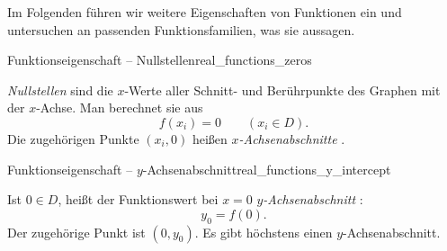 \par\noindent\begin{minipage}{\linewidth}
Im Folgenden führen wir weitere Eigenschaften von Funktionen ein und
untersuchen an passenden Funktionsfamilien, was sie aussagen.
\begin{DefinitionBox}{Funktionseigenschaft -- Nullstellen}{real_functions_zeros}
  \begin{minipage}[c]{0.55\linewidth}
    \raggedright
    \emph{Nullstellen}  sind die $x$-Werte aller Schnitt-
    und Berührpunkte des Graphen mit der $x$-Achse. Man berechnet sie aus
    \[
      f(x_i)=0\qquad(x_i\in D).
    \]
    Die zugehörigen Punkte $(x_i,0)$ heißen \emph{$x$-Achsenabschnitte}
    .
  \end{minipage}\hfill
  \begin{minipage}[c]{0.43\linewidth}
    \centering
  \end{minipage}
\end{DefinitionBox}
\end{minipage}
\begin{DefinitionBox}{Funktionseigenschaft -- $y$-Achsenabschnitt}{real_functions_y_intercept}
  \begin{minipage}[c]{0.55\linewidth}
    \raggedright
    Ist $0\in D$, heißt der Funktionswert bei $x=0$
    \emph{$y$-Achsenabschnitt} :
    \[
      y_0=f(0).
    \]
    Der zugehörige Punkt ist $(0,y_0)$. Es gibt höchstens einen
    $y$-Achsenabschnitt.
  \end{minipage}\hfill
  \begin{minipage}[c]{0.43\linewidth}
    \centering
  \end{minipage}
\end{DefinitionBox}

